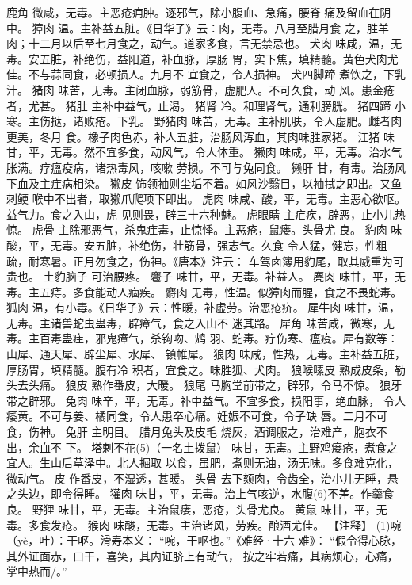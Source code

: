 \documentclass[12pt,UTF8]{ctexbook}
\begin{document}
鹿角 微咸，无毒。主恶疮痈肿。逐邪气，除小腹血、急痛，腰脊
痛及留血在阴中。
獐肉 温。主补益五脏。《日华子》云：肉，无毒。八月至腊月食
之，胜羊肉；十二月以后至七月食之，动气。道家多食，言无禁忌也。
犬肉 味咸，温，无毒。安五脏，补绝伤，益阳道，补血脉，厚肠
胃，实下焦，填精髓。黄色犬肉尤佳。不与蒜同食，必顿损人。九月不
宜食之，令人损神。
犬四脚蹄 煮饮之，下乳汁。
猪肉 味苦，无毒。主闭血脉，弱筋骨，虚肥人。不可久食，动
风。患金疮者，尤甚。
猪肚 主补中益气，止渴。
猪肾 冷。和理肾气，通利膀胱。
猪四蹄 小寒。主伤挞，诸败疮。下乳。
野猪肉 味苦，无毒。主补肌肤，令人虚肥。雌者肉更美，冬月
食。橡子肉色赤，补人五脏，治肠风泻血，其肉味胜家猪。
江猪 味甘，平，无毒。然不宜多食，动风气，令人体重。
獭肉 味咸，平，无毒。治水气胀满。疗瘟疫病，诸热毒风，咳嗽
劳损。不可与兔同食。
獭肝 甘，有毒。治肠风下血及主疰病相染。
獭皮 饰领袖则尘垢不着。如风沙翳目，以袖拭之即出。又鱼刺鲠
喉中不出者，取獭爪爬项下即出。
虎肉 味咸、酸，平，无毒。主恶心欲呕。益气力。食之入山，虎
见则畏，辟三十六种魅。
虎眼睛 主疟疾，辟恶，止小儿热惊。
虎骨 主除邪恶气，杀鬼疰毒，止惊悸。主恶疮，鼠瘘。头骨尤
良。
豹肉 味酸，平，无毒。安五脏，补绝伤，壮筋骨，强志气。久食
令人猛，健忘，性粗疏，耐寒暑。正月勿食之，伤神。《唐本》注云：
车驾卤簿用豹尾，取其威重为可贵也。
土豹脑子 可治腰疼。
麅子 味甘，平，无毒。补益人。
麂肉 味甘，平，无毒。主五痔。多食能动人痼疾。
麝肉 无毒，性温。似獐肉而腥，食之不畏蛇毒。
狐肉 温，有小毒。《日华子》云：性暖，补虚劳。治恶疮疥。
犀牛肉 味甘，温，无毒。主诸兽蛇虫蛊毒，辟瘴气，食之入山不
迷其路。
犀角 味苦咸，微寒，无毒。主百毒蛊疰，邪鬼瘴气，杀钩吻、鸩
羽、蛇毒。疗伤寒、瘟疫。犀有数等：山犀、通天犀、辟尘犀、水犀、
镇帷犀。
狼肉 味咸，性热，无毒。主补益五脏，厚肠胃，填精髓。腹有冷
积者，宜食之。味胜狐、犬肉。
狼喉嗉皮 熟成皮条，勒头去头痛。
狼皮 熟作番皮，大暖。
狼尾 马胸堂前带之，辟邪，令马不惊。
狼牙 带之辟邪。
兔肉 味辛，平，无毒。补中益气。不宜多食，损阳事，绝血脉，
令人痿黄。不可与姜、橘同食，令人患卒心痛。妊娠不可食，令子缺
唇。二月不可食，伤神。
兔肝 主明目。
腊月兔头及皮毛 烧灰，酒调服之，治难产，胞衣不出，余血不
下。
塔剌不花(5)（一名土拨鼠）
味甘，无毒。主野鸡瘘疮，煮食之宜人。生山后草泽中。北人掘取
以食，虽肥，煮则无油，汤无味。多食难克化，微动气。
皮 作番皮，不湿透，甚暖。
头骨 去下颏肉，令齿全，治小儿无睡，悬之头边，即令得睡。
獾肉 味甘，平，无毒。治上气咳逆，水腹(6)不差。作羹食良。
野狸 味甘，平，无毒。主治鼠瘘，恶疮，头骨尤良。
黄鼠 味甘，平，无毒。多食发疮。
猴肉 味酸，无毒。主治诸风，劳疾。酿酒尤佳。
【注释】
(1)啘（yè，叶）：干呕。滑寿本义：
“啘，干呕也。”《难经·十六
难》：
“假令得心脉，其外证面赤，口干，喜笑，其内证脐上有动气，
按之牢若痛，其病烦心，心痛，掌中热而/。”
\end{document}
